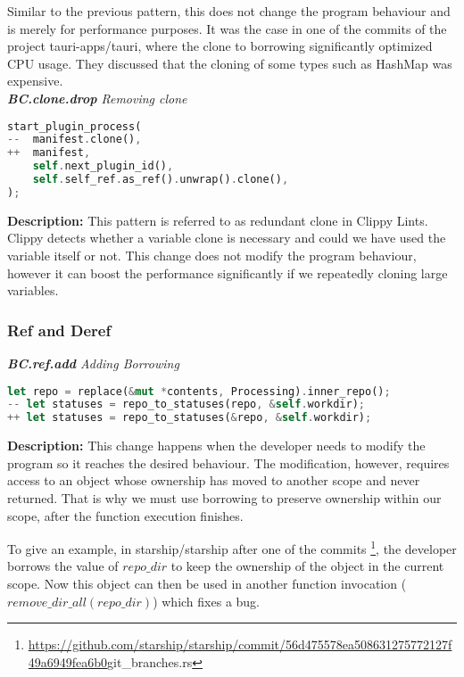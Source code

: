 Similar to the previous pattern, this does not change the program behaviour and is merely for performance purposes. It was the case in one of the commits of the project tauri-apps/tauri, where the clone to borrowing significantly optimized CPU usage. They discussed that the cloning of some types such as HashMap was expensive. \\

\noindent \textit{ \textbf{BC.clone.drop} Removing clone}

\begin{lstlisting}[language=Rust, style=colouredRust, label={l3}]
start_plugin_process(
--  manifest.clone(),
++  manifest,
    self.next_plugin_id(),
    self.self_ref.as_ref().unwrap().clone(),
);
\end{lstlisting}

\noindent \textbf{Description:} This pattern is referred to as redundant clone in Clippy Lints. Clippy detects whether a variable clone is necessary and could we have used the variable itself or not. This change does not modify the program behaviour, however it can boost the performance significantly if we repeatedly cloning large variables. 

\subsubsection{Ref and Deref}

\noindent \textit{ \textbf{BC.ref.add} Adding Borrowing}

\begin{lstlisting}[language=Rust, style=colouredRust, label={l3}]
let repo = replace(&mut *contents, Processing).inner_repo();
-- let statuses = repo_to_statuses(repo, &self.workdir);
++ let statuses = repo_to_statuses(&repo, &self.workdir);
\end{lstlisting}

\noindent \textbf{Description:} This change happens when the developer needs to modify the program so it reaches the desired behaviour. The modification, however, requires access to an object whose ownership has moved to another scope and never returned. That is why we must use borrowing to preserve ownership within our scope, after the function execution finishes.

To give an example, in starship/starship after one of the commits \footnote{\url{https://github.com/starship/starship/commit/56d475578ea508631275772127f49a6949fea6b0}{git_branches.rs}}, the developer borrows the value of $repo\_dir$ to keep the ownership of the object in the current scope. Now this object can then be used in another function invocation ($remove\_dir\_all(repo\_dir)$) which fixes a bug. \\

